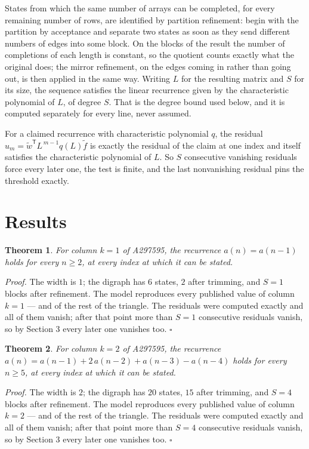 \documentclass[11pt]{article}
\newtheorem{theorem}{Theorem}
\theoremstyle{definition}
\begin{document}
States from which the same number of arrays can be completed, for every remaining number of rows, are identified by partition refinement: begin with the partition by acceptance and separate two states as soon as they send different numbers of edges into some block. On the blocks of the result the number of completions of each length is constant, so the quotient counts exactly what the original does; the mirror refinement, on the edges coming in rather than going out, is then applied in the same way. Writing $L$ for the resulting matrix and $S$ for its size, the sequence satisfies the linear recurrence given by the characteristic polynomial of $L$, of degree $S$. That is the degree bound used below, and it is computed separately for every line, never assumed.

For a claimed recurrence with characteristic polynomial $q$, the residual $u_m = \tilde w^{\mathsf T}L^{\,m-1}q(L)\tilde f$ is exactly the residual of the claim at one index and itself satisfies the characteristic polynomial of $L$. So $S$ consecutive vanishing residuals force every later one, the test is finite, and the last nonvanishing residual pins the threshold exactly.

\section{Results}

\begin{theorem} For column $k = 1$ of A297595, the recurrence $a(n) = a(n-1)$ holds for every $n \ge 2$, at every index at which it can be stated.\end{theorem}

{\itshape Proof.} The width is $1$; the digraph has $6$ states, $2$ after trimming, and $S = 1$ blocks after refinement. The model reproduces every published value of column $k = 1$ --- and of the rest of the triangle. The residuals were computed exactly and all of them vanish; after that point more than $S = 1$ consecutive residuals vanish, so by Section 3 every later one vanishes too. $\square$

\begin{theorem} For column $k = 2$ of A297595, the recurrence $a(n) = a(n-1) + 2\,a(n-2) + a(n-3) - a(n-4)$ holds for every $n \ge 5$, at every index at which it can be stated.\end{theorem}

{\itshape Proof.} The width is $2$; the digraph has $20$ states, $15$ after trimming, and $S = 4$ blocks after refinement. The model reproduces every published value of column $k = 2$ --- and of the rest of the triangle. The residuals were computed exactly and all of them vanish; after that point more than $S = 4$ consecutive residuals vanish, so by Section 3 every later one vanishes too. $\square$
\end{document}

